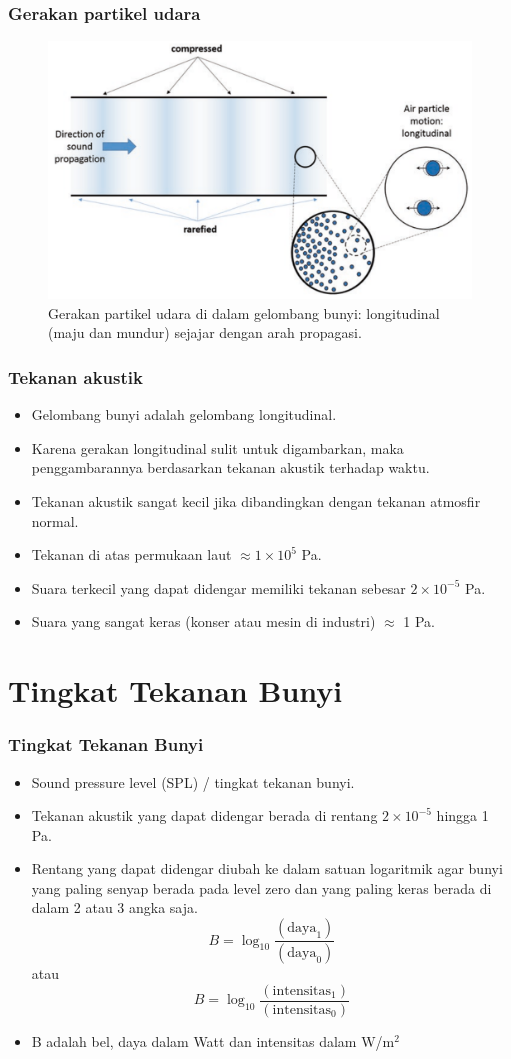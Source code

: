 \documentclass[pdflatex,compress]{beamer}
\begin{document}
\begin{frame}
	\frametitle{Gerakan partikel udara}
	\begin{figure}
		\centering
		\includegraphics[width=0.7\linewidth]{img/img001}
		\caption[]{Gerakan partikel udara di dalam gelombang bunyi: longitudinal (maju dan mundur) sejajar dengan arah propagasi.}
		\label{fig:img001}
	\end{figure}
\end{frame}

\begin{frame}
	\frametitle{Tekanan akustik}
	\begin{itemize}
		\item Gelombang bunyi adalah gelombang longitudinal.
		\item Karena gerakan longitudinal sulit untuk digambarkan, maka penggambarannya berdasarkan tekanan akustik terhadap waktu.
		\item Tekanan akustik sangat kecil jika dibandingkan dengan tekanan atmosfir normal.
		\item Tekanan di atas permukaan laut $ \approx 1 \times 10^5 $ Pa.
		\item Suara terkecil yang dapat didengar memiliki tekanan sebesar $ 2 \times 10^{-5} $ Pa.
		\item Suara yang sangat keras (konser atau mesin di industri) $\approx$ 1 Pa.
	\end{itemize}
\end{frame}

\section{Tingkat Tekanan Bunyi}

\begin{frame}
	\frametitle{Tingkat Tekanan Bunyi}
	\begin{itemize}
		\item Sound pressure level (SPL) / tingkat tekanan bunyi.
		\item Tekanan akustik yang dapat didengar berada di rentang $ 2 \times 10^{-5} $ hingga 1 Pa.
		\item Rentang yang dapat didengar diubah ke dalam satuan logaritmik agar bunyi yang paling senyap berada pada level zero dan yang paling keras berada di dalam 2 atau 3 angka saja.
		\[ B = \log_{10}\frac{(\text{daya}_1)}{(\text{daya}_0)} \] atau 
		\[ B = \log_{10}\frac{(\text{intensitas}_1)}{(\text{intensitas}_0)} \]
		\item B adalah bel, daya dalam Watt dan intensitas dalam W/m$ ^2 $
	\end{itemize}
\end{frame}
\end{document}
